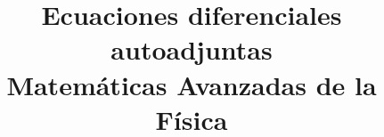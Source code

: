 
\usepackage{mathrsfs}
\newcommand{\doblederivaday}[1]{#1^{\prime \prime}}
\newcommand{\derivaday}[1]{#1^{\prime}}
\newcommand{\dderivadacociente}[2]{\dfrac{d^{2} #1}{d #2^{2}}}
\newcommand{\derivadacociente}[2]{\dfrac{d {#1}}{d #2}}
\newtheorem{defi}{{\it Definición}}[section]
\newtheorem{ejemplo}{{\it Ejemplo}}[section]
\title{Ecuaciones diferenciales autoadjuntas \\ {\large Matemáticas Avanzadas de la Física}}
\date{ }

\renewcommand\labelenumii{\theenumi.{\arabic{enumii}}}
\maketitle
\fontsize{14}{14}\selectfont
